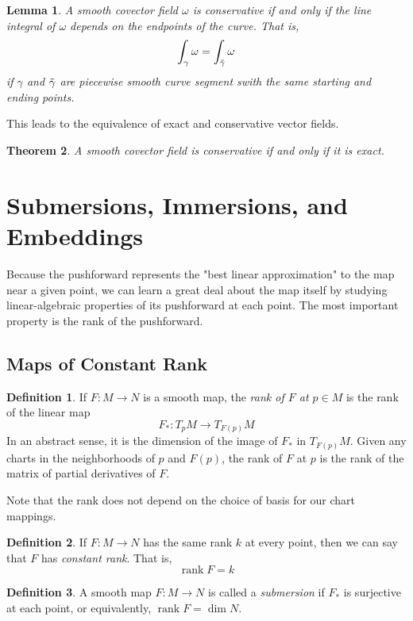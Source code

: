 \documentclass{article}
\DeclareMathOperator{\rank}{rank}
\newtheorem{theorem}{Theorem}[section]
\newtheorem{lemma}[theorem]{Lemma}
\theoremstyle{remark}
\theoremstyle{definition}
\newtheorem{definition}{Definition}[section]
\begin{document}
\begin{lemma}
A smooth covector field $\omega$ is conservative if and only if the line integral of $\omega$ depends on the endpoints of the curve. That is, 
\[\int_\gamma \omega = \int_{\Tilde{\gamma}} \omega\]
if $\gamma$ and $\Tilde{\gamma}$ are piecewise smooth curve segment swith the same starting and ending points. 
\end{lemma}

This leads to the equivalence of exact and conservative vector fields. 

\begin{theorem}
A smooth covector field is conservative if and only if it is exact. 
\end{theorem}

\section{Submersions, Immersions, and Embeddings}
Because the pushforward represents the "best linear approximation" to the map near a given point, we can learn a great deal about the map itself by studying linear-algebraic properties of its pushforward at each point. The most important property is the rank of the pushforward. 

\subsection{Maps of Constant Rank}
\begin{definition}
If $F: M \longrightarrow N$ is a smooth map, the \textit{rank of $F$ at $p \in M$} is the rank of the linear map 
\[F_*: T_p M \longrightarrow T_{F(p)}M\]
In an abstract sense, it is the dimension of the image of $F_*$ in $T_{F(p)} M$. Given any charts in the neighborhoods of $p$ and $F(p)$, the rank of $F$ at $p$ is the rank of the matrix of partial derivatives of $F$. 
\end{definition}

Note that the rank does not depend on the choice of basis for our chart mappings. 

\begin{definition}
If $F: M \longrightarrow N$ has the same rank $k$ at every point, then we can say that $F$ has \textit{constant rank}. That is, 
\[\rank{F} = k\]
\end{definition}

\begin{definition}
A smooth map $F: M \longrightarrow N$ is called a \textit{submersion} if $F_*$ is surjective at each point, or equivalently, $\rank{F} = \dim{N}$. 
\end{definition}
\end{document}
